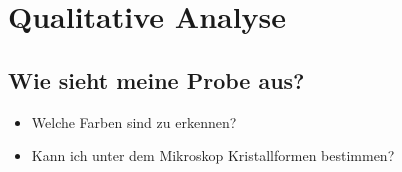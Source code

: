 \documentclass{article}
\begin{document}
\section{Qualitative Analyse}
\subsection{Wie sieht meine Probe aus?}
\begin{itemize}
    \item Welche Farben sind zu erkennen?
    \item Kann ich unter dem Mikroskop Kristallformen bestimmen?
\end{itemize}
\end{document}
